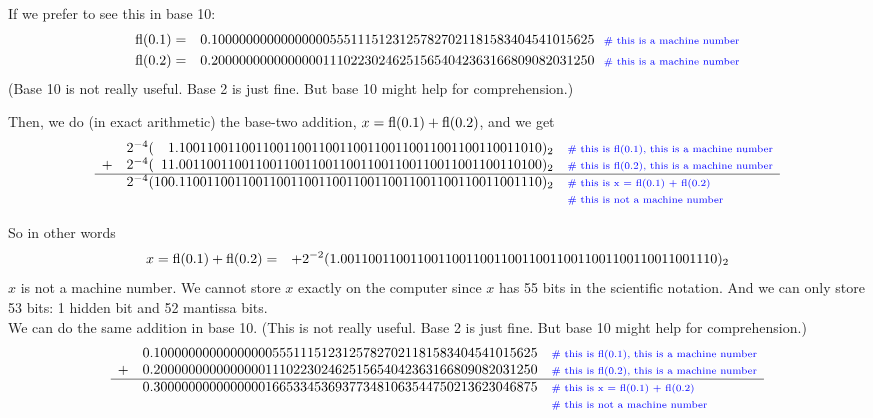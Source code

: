 \documentclass[pdftex,11pt]{article}
\begin{document}
If we prefer to see this in base 10:
\begin{eqnarray}
 \nonumber \textmd{fl}(0.1)       & = &  0.1000000000000000055511151231257827021181583404541015625~~\textmd{\scriptsize\color{blue}\# this is a machine number}\\
 \nonumber \textmd{fl}(0.2)       & = &  0.2000000000000000111022302462515654042363166809082031250~~\textmd{\scriptsize\color{blue}\# this is a machine number}
\end{eqnarray}
(Base 10 is not really useful. Base 2 is just fine. But base 10 might help for comprehension.) 


Then, we do (in exact arithmetic) the base-two addition, $x = \textmd{fl}(0.1) + \textmd{fl}(0.2)$, and we get
$$
\begin{array}{ccl}
  & 2^{-4}( \phantom{11}1.1001100110011001100110011001100110011001100110011010 )_2 & \textmd{\scriptsize\color{blue}\# this is fl(0.1), this is a machine number} \\
+ & 2^{-4}( \phantom{1}11.0011001100110011001100110011001100110011001100110100 )_2 & \textmd{\scriptsize\color{blue}\# this is fl(0.2), this is a machine number} \\
\hline
  & 2^{-4}(           100.1100110011001100110011001100110011001100110011001110 )_2 & \textmd{\scriptsize\color{blue}\# this is x = fl(0.1) + fl(0.2)}\\
  &                                                                                & \textmd{\scriptsize\color{blue}\# this is not a machine number }
\end{array}
$$

So in other words
\begin{eqnarray}
 \nonumber x = \textmd{fl}(0.1)+\textmd{fl}(0.2)       & = &  + 2^{-2} ( 1.001100110011001100110011001100110011001100110011001110 )_2 
\end{eqnarray}
$x$ is not a machine number. We cannot store $x$ exactly on the computer since
$x$ has 55 bits in the scientific notation. And we can only store 53 bits: 1
hidden bit and 52 mantissa bits.\\


We can do the same addition in base 10. (This is not really useful. Base 2 is just fine. But base 10 might help for comprehension.)
$$
\begin{array}{ccl}
  & 0.1000000000000000055511151231257827021181583404541015625 & \textmd{\scriptsize\color{blue}\# this is fl(0.1), this is a machine number} \\
+ & 0.2000000000000000111022302462515654042363166809082031250 & \textmd{\scriptsize\color{blue}\# this is fl(0.2), this is a machine number} \\
\hline
  & 0.3000000000000000166533453693773481063544750213623046875 & \textmd{\scriptsize\color{blue}\# this is x = fl(0.1) + fl(0.2)}\\
  &                                                                                & \textmd{\scriptsize\color{blue}\# this is not a machine number }
\end{array}
$$
\end{document}

